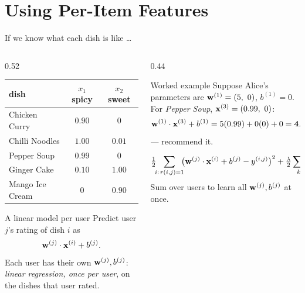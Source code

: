 \documentclass[aspectratio=169,10pt]{beamer}
\begin{document}
\section{Using Per-Item Features}

\begin{frame}{If we know what each dish is like \dots}
  \begin{columns}[T,onlytextwidth]
    \begin{column}{0.52\textwidth}
      \footnotesize
      \renewcommand{\arraystretch}{1.15}
      \begin{tabular}{@{}lcc@{}}
        \toprule
        dish & $x_1$ spicy & $x_2$ sweet\\
        \midrule
        Chicken Curry          & $0.90$ & $0$\\
        Chilli Noodles       & $1.00$ & $0.01$\\
        Pepper Soup  & $0.99$ & $0$\\
        Ginger Cake    & $0.10$ & $1.00$\\
        Mango Ice Cream    & $0$    & $0.90$\\
        \bottomrule
      \end{tabular}\par
      \vspace{2mm}
      \begin{block}{A linear model per user}
        Predict user $j$'s rating of dish $i$ as
        \[ \mathbf{w}^{(j)}\cdot\mathbf{x}^{(i)} + b^{(j)} . \]
        Each user has their own $\mathbf{w}^{(j)}, b^{(j)}$: \emph{linear regression,
        once per user}, on the dishes that user rated.
      \end{block}
    \end{column}
    \begin{column}{0.44\textwidth}
      \footnotesize
      \begin{block}{Worked example}
        Suppose Alice's parameters are $\mathbf{w}^{(1)} = (5,\ 0)$, $b^{(1)} = 0$.
        For \emph{Pepper Soup}, $\vx^{(3)} = (0.99,\ 0)$:
        \[ \mathbf{w}^{(1)}\cdot\mathbf{x}^{(3)} + b^{(1)} = 5(0.99) + 0(0) + 0 = \mathbf{4.95} \]
        --- recommend it.
      \end{block}
      \begin{defnbox}
        \small
        \[ \tfrac12\!\!\sum_{i:\,r(i,j)=1}\!\!\bigl(\mathbf{w}^{(j)}\cdot\mathbf{x}^{(i)} + b^{(j)} - y^{(i,j)}\bigr)^2
           + \tfrac{\lambda}{2}\sum_k \bigl(w^{(j)}_k\bigr)^2 \]
        Sum over users to learn all $\mathbf{w}^{(j)}, b^{(j)}$ at once.
      \end{defnbox}
    \end{column}
  \end{columns}
\end{frame}
\end{document}
